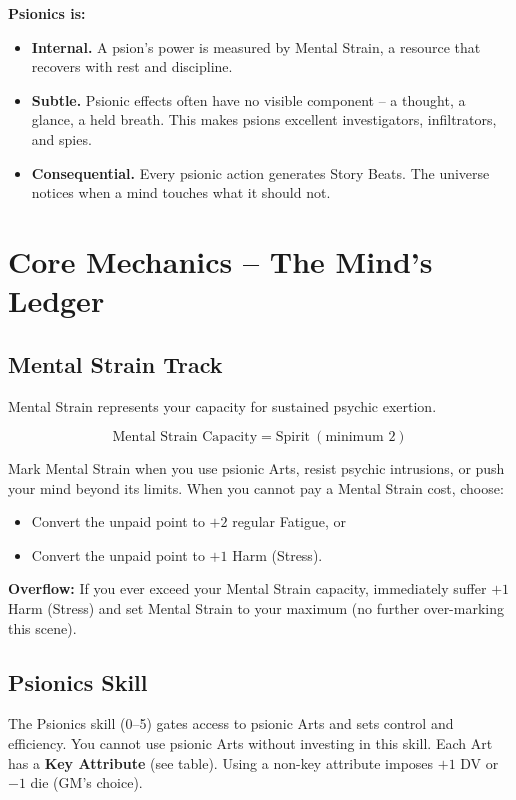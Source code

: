 \documentclass[10pt,a5paper]{book}
\begin{document}
\textbf{Psionics is:}
\begin{itemize}
    \item \textbf{Internal.} A psion's power is measured by Mental Strain, a resource that recovers with rest and discipline.
    \item \textbf{Subtle.} Psionic effects often have no visible component -- a thought, a glance, a held breath. This makes psions excellent investigators, infiltrators, and spies.
    \item \textbf{Consequential.} Every psionic action generates Story Beats. The universe notices when a mind touches what it should not.
\end{itemize}

\section{Core Mechanics -- The Mind's Ledger}

\subsection{Mental Strain Track}
Mental Strain represents your capacity for sustained psychic exertion.

\[
\text{Mental Strain Capacity} = \text{Spirit}\ (\text{minimum } 2)
\]

Mark Mental Strain when you use psionic Arts, resist psychic intrusions, or push your mind beyond its limits. When you cannot pay a Mental Strain cost, choose:
\begin{itemize}
    \item Convert the unpaid point to \(+2\) regular Fatigue, or
    \item Convert the unpaid point to \(+1\) Harm (Stress).
\end{itemize}

\textbf{Overflow:} If you ever exceed your Mental Strain capacity, immediately suffer \(+1\) Harm (Stress) and set Mental Strain to your maximum (no further over-marking this scene).

\subsection{Psionics Skill}
The Psionics skill (0--5) gates access to psionic Arts and sets control and efficiency. You cannot use psionic Arts without investing in this skill. Each Art has a \textbf{Key Attribute} (see table). Using a non-key attribute imposes \(+1\) DV or \(-1\) die (GM's choice).
\end{document}
